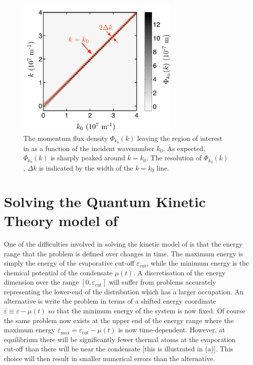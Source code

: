 \begin{figure}
    \centering
    \includegraphics[width=8cm]{PhiAccuracy}
    \caption{\label{MethodsAppendix:PhiAccuracy} The momentum flux density $\Phi_{k_0}(k)$ leaving the region of interest in  as a function of the incident wavenumber $k_0$. As expected, $\Phi_{k_0}(k)$ is sharply peaked around $k=k_0$. The resolution of $\Phi_{k_0}(k)$, $\Delta k$ is indicated by the width of the $k=k_0$ line.}
\end{figure}

\section[Solving the Quantum Kinetic Theory model]{Solving the Quantum Kinetic Theory model of }
\label{MethodsAppendix:KineticTheory}

One of the difficulties involved in solving the kinetic model of  is that the energy range that the problem is defined over changes in time.  The maximum energy is simply the energy of the evaporative cut-off $\varepsilon_\text{cut}$, while the minimum energy is the chemical potential of the condensate $\mu(t)$.  A discretisation of the energy dimension over the range $[0, \varepsilon_\text{cut}]$ will suffer from problems accurately representing the lower-end of the distribution which has a larger occupation.  An alternative is write the problem in terms of a shifted energy coordinate $\overline{\varepsilon} \equiv \varepsilon - \mu(t)$ so that the minimum energy of the system is now fixed.  Of course the same problem now exists at the upper end of the energy range where the maximum energy $\overline{\varepsilon}_\text{max} = \varepsilon_\text{cut} - \mu(t)$ is now time-dependent.  However, at equilibrium there will be significantly fewer thermal atoms at the evaporation cut-off than there will be near the condensate [this is illustrated in (a)].  This choice will then result in smaller numerical errors than the alternative.

